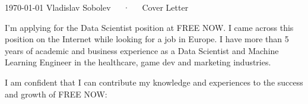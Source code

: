 \documentclass[11pt, a4paper]{awesome-cv}
\newcommand\companyname{FREE NOW}
\begin{document}
\makecvheader[R]

\makecvfooter
  {\today}
  {Vladislav Sobolev~~~·~~~Cover Letter}
  {}

\makelettertitle

\begin{cvletter}



I'm applying for the Data Scientist position at {\companyname}. I came across this position on the Internet while looking for a job in Europe. I have more than 5 years of academic and business experience as a Data Scientist and Machine Learning Engineer in the healthcare, game dev and marketing industries.


I am confident that I can contribute my knowledge and experiences to the success and growth of {\companyname}:

\bigskip
\begin{cvitems}
  

\end{cvitems}
\end{cvletter}
\end{document}
